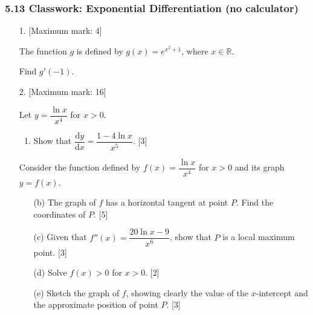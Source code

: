 \documentclass[12pt, twoside]{article}
\begin{document}
\subsubsection*{5.13 Classwork: Exponential Differentiation (no calculator)}

\begin{enumerate}[itemsep=0.15cm]

\item[1.] [Maximum mark: 4]

The function $g$ is defined by $g(x) = e^{x^2 + 1}$, where $x \in \mathbb{R}$.

Find $g'(-1)$.


\item[2.] [Maximum mark: 16]

Let $y = \dfrac{\ln x}{x^4}$ for $x > 0$.

\begin{enumerate}[itemsep=0.15cm]
  \item Show that $\dfrac{\mathrm{d}y}{\mathrm{d}x} = \dfrac{1 - 4\ln x}{x^5}$. \hfill [3]
\end{enumerate}

Consider the function defined by $f(x) = \dfrac{\ln x}{x^4}$ for $x > 0$
and its graph $y = f(x)$.

\begin{enumerate}[itemsep=0.15cm]
  \item[(b)] The graph of $f$ has a horizontal tangent at point $P$.
  Find the coordinates of $P$. \hfill [5]
  \item[(c)] Given that $f''(x) = \dfrac{20\ln x - 9}{x^6}$, show that $P$
  is a local maximum point. \hfill [3]
  \item[(d)] Solve $f(x) > 0$ for $x > 0$. \hfill [2]
  \item[(e)] Sketch the graph of $f$, showing clearly the value of the
  $x$-intercept and the approximate position of point $P$. \hfill [3]
\end{enumerate}

\end{enumerate}
\end{document}
